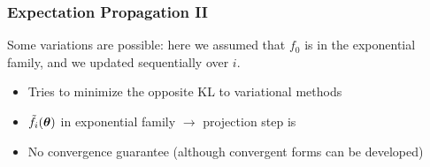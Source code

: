 \begin{frame}
\frametitle{Expectation Propagation II}


\centerline{
}

 Some variations are possible: here we assumed
  that $f_0$ is in the exponential family, and we updated sequentially over
  $i$. %
\begin{itemize}
\item Tries to minimize the opposite KL to variational methods
\item $\tilde{f}_i(\boldsymbol{\theta})$ in exponential family $\rightarrow$
projection step is  
\item No convergence guarantee (although convergent forms can be developed) 
\end{itemize}

\end{frame}
